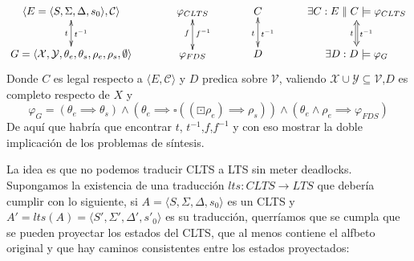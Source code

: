 \[\xymatrix@C+1pc{
	\langle E = \langle S, \Sigma, \Delta, s_0 \rangle, \mathcal{C} \rangle \ar@{<->}[d]^{t^{-1}}_{t}
	& \varphi_{CLTS}\ar@{<->}[d]^{f^{-1}}_{f}
	& C\ar@{<->}[d]^{t^{-1}}_{t}
	& \exists C: E\parallel C \models  \varphi_{CLTS}\ar@{<=>}[d]^{t^{-1}}_{t}\\
	G = \langle \mathcal{X},\mathcal{Y},\theta_e,\theta_s,\rho_e,\rho_s, \emptyset \rangle
	& \varphi_{FDS}
	& D
	&\exists D: D \models \varphi_G\\
}\]
Donde $C$ es legal respecto a $\langle E,\mathcal{C} \rangle$ y $D$ predica sobre $\mathcal{V}$, valiendo $\mathcal{X} \cup \mathcal{Y} \subseteq \mathcal{V}$,$D$ es completo respecto de $X$ y
\[\varphi_G = (\theta_e \implies \theta_s) \wedge (\theta_e \implies \square((\boxdot \rho_e) \implies \rho_s)) \wedge (\theta_e \wedge \rho_e \implies \varphi_{FDS}) \]
De aquí que habría que encontrar $t$, $t^{-1}$,$f$,$f^{-1}$ y con eso mostrar la doble implicación de los problemas de síntesis.

La idea es que no podemos traducir CLTS a LTS sin meter deadlocks.
Supongamos la existencia de una traducción $lts:CLTS \rightarrow LTS$ que debería cumplir con lo siguiente, si $A=\langle S, \Sigma, \Delta, s_0 \rangle$ es un CLTS y $A'=lts(A)=\langle S', \Sigma', \Delta', s'_0 \rangle$ es su traducción, querríamos que se cumpla que se pueden proyectar los estados del CLTS, que al menos contiene el alfbeto original y que hay caminos consistentes entre los estados proyectados:

